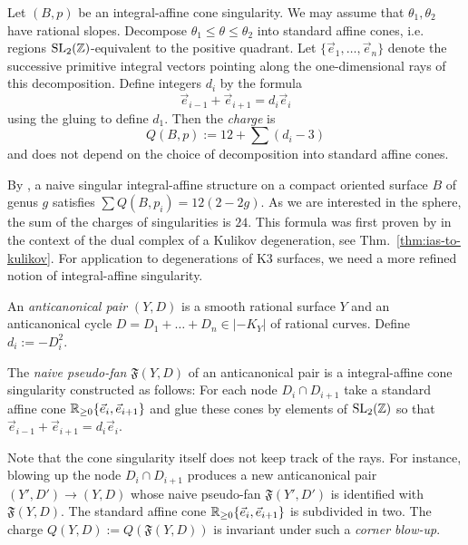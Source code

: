 \documentclass[table,x11names]{amsart}
\begin{document}
 \begin{definition}  Let $(B,p)$ be an integral-affine cone singularity.
 We may assume that $\theta_1, \theta_2$ have rational slopes.
 Decompose $\theta_1\leq \theta\leq \theta_2$ into
 standard affine cones, i.e. regions $\operatorname{SL}_2(\mathbb{Z})$-equivalent
 to the positive quadrant. Let $\{\vec{e}_1,\dots,\vec{e}_n\}$
 denote the successive primitive integral vectors pointing
 along the one-dimensional rays of this
 decomposition. Define integers $d_i$ by the formula
 $$\vec{e}_{i-1}+\vec{e}_{i+1}=d_i\vec{e}_i$$ using the
 gluing to define $d_1$. Then the {\it charge} is $$Q(B,p):=12+\sum (d_i-3)$$ and
 does not depend on the choice of 
 decomposition into standard affine cones.
  \end{definition}

By \cite{engel2018moduli-space, kontsevich2006affine-structures}, 
a naive singular integral-affine
structure on a compact oriented surface $B$ of genus $g$
satisfies $\sum Q(B,p_i) = 12(2-2g)$. As we are interested in
the sphere, the sum of the charges of singularities is $24$. This formula was
first proven by \cite[Prop.~3.7]{friedman1983smoothing-cusp} in the context
of the dual complex of a Kulikov degeneration, see Thm.~\ref{thm:ias-to-kulikov}.
For application to degenerations of K3 surfaces, we
need a more refined notion of integral-affine singularity.

\begin{definition} An {\it anticanonical pair} $(Y,D)$ is a smooth rational surface
$Y$ and an anticanonical cycle $D=D_1+\dots+D_n \in |-K_Y|$ of rational curves. 
Define $d_i:=-D_i^2$. \end{definition}

\begin{definition} The {\it naive pseudo-fan} $\mathfrak{F}(Y,D)$ of
  an anticanonical pair is a integral-affine cone singularity
  constructed as follows: For each node $D_i\cap D_{i+1}$ take a
  standard affine cone $\mathbb{R}_{\geq 0}\{\vec{e}_i,\vec{e}_{i+1}\}$ and
  glue these cones by elements of $\operatorname{SL}_2(\mathbb{Z})$ so that
  $\vec{e}_{i-1}+\vec{e}_{i+1} = d_i \vec{e}_i$. 
\end{definition}

\begin{remark}\label{cbec-invt} 
Note that the cone singularity itself does not keep track of the rays.
For instance, blowing up the node
$D_i\cap D_{i+1}$ produces a new anticanonical pair
$(Y',D')\to (Y,D)$ whose naive pseudo-fan $\mathfrak{F}(Y',D')$ is identified
with $\mathfrak{F}(Y,D)$. The standard affine cone
$\mathbb{R}_{\geq 0}\{\vec{e}_i,\vec{e}_{i+1}\}$ is subdivided in two.
The charge $Q(Y,D):=Q(\mathfrak{F}(Y,D))$
is invariant under such a {\it corner blow-up}. \end{remark} 
\end{document}
